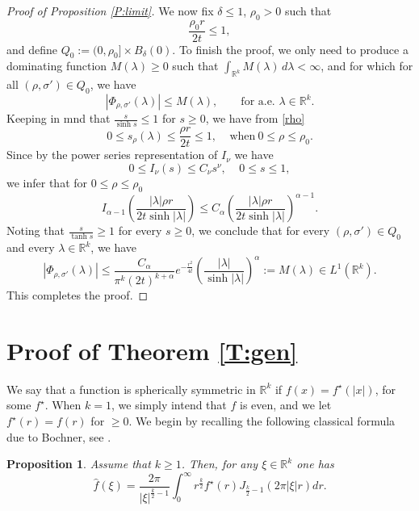 \documentclass[11pt,a4paper]{amsart}
\def \R {\mathbb{R}}
\newcommand{\la}{\lambda}
\numberwithin{equation}{section}
\newtheorem{proposition}[theorem]{Proposition}
\numberwithin{equation}{section}
\begin{document}
\begin{proof}[Proof of Proposition \ref{P:limit}]
We now fix $\delta\le 1$, $\rho_0>0$ such that  
\begin{equation}\label{rho}
\frac{\rho_0 r}{2t} \le1,
\end{equation}
and define $Q_0 :=(0,\rho_0]\times B_{\delta}(0)$. To finish the proof, we only need to produce a dominating function $M(\lambda)\ge 0$ such that $\int_{\mathbb R^k} M(\lambda)\,d\lambda<\infty$, and for which for all $(\rho,\sigma')\in Q_0$, we have
\begin{equation}\label{dominate}
\left|\Phi_{\rho,\sigma'}(\lambda)\right|\le M(\lambda),\qquad\text{for a.e. }\lambda\in\mathbb R^k.
\end{equation}
Keeping in mnd that $\frac{s}{\sinh s}\le 1$ for $s\ge 0$, 
we have from \eqref{rho}
\[
0\le s_\rho(\lambda) \le \frac{\rho r}{2t} \le 1,\ \ \ \ \ \text{when}\ 0\le \rho\le \rho_0.
\]
Since by the power series representation of $I_\nu$ we have 
\[
0\le I_\nu(s)\le C_\nu s^\nu,\ \ \ \ \ 0\le s\le 1,
\]
we infer that for $0\le \rho\le \rho_0$
\[
I_{\alpha-1}\left(\frac{|\lambda|\rho r}{2t\sinh |\lambda|}\right) \le C_\alpha \left(\frac{|\lambda|\rho r}{2t\sinh |\lambda|}\right)^{\alpha-1}.
\]
Noting that $\frac{s}{\tanh s} \ge 1$ for every $s\ge 0$, we conclude that for every $(\rho,\sigma')\in Q_0$ and every $\la\in \R^k$, we have
\[
|\Phi_{\rho,\sigma'}(\lambda)| \le \frac{C_\alpha}{\pi^k (2t)^{k+\alpha}} e^{-
\frac{r^2}{4t}}
\left(\frac{|\lambda|}{\sinh |\lambda|}\right)^{\alpha} := M(\la)\in L^1(\R^k).
\]
This completes the proof.

\end{proof}


\section{Proof of Theorem \ref{T:gen}}\label{S:gen}

We say that a  function is spherically symmetric in $\R^k$ if $f(x) = f^\star(|x|)$, for some $f^\star$. When $k=1$, we simply intend that $f$ is even, and we let $f^\star(r) = f(r)$ for $\ge 0$. We begin by recalling the following classical formula due to Bochner, see \cite[Theor. 40 on p. 69]{BC}. 

\begin{proposition}\label{P:boch}
Assume that $k\ge 1$. Then, for any $\xi\in \R^k$ one has
\[
\hat f(\xi) = \frac{2\pi}{|\xi|^{\frac k2 - 1}} \int_0^\infty r^{\frac k2} f^\star(r) 
J_{\frac{k}2-1}(2\pi |\xi| r) dr.
\]
\end{proposition}
\end{document}
